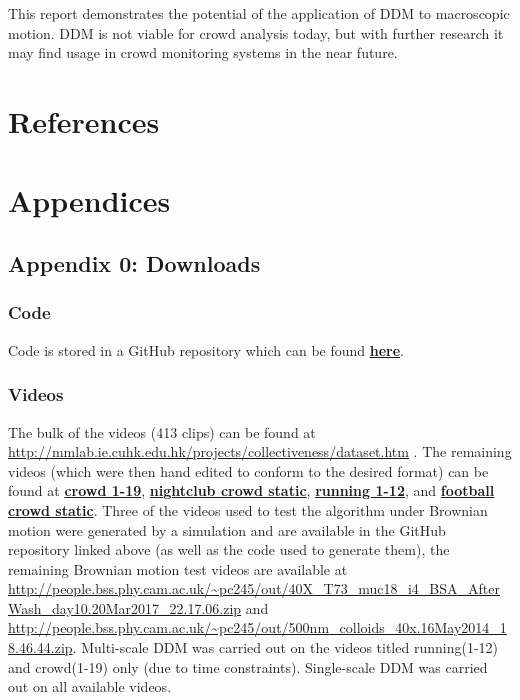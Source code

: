 \documentclass[10pt]{article}
\let\oldhref\href
\renewcommand{\href}[2]{\oldhref{#1}{\bfseries#2}}
\begin{document}
\\\\
This report demonstrates the potential of the application of DDM to macroscopic motion. DDM is not viable for crowd analysis today, but with further research it may find usage in crowd monitoring systems in the near future.

\clearpage
\section{References}
\printbibliography[heading=none]

\clearpage
\section{Appendices}
\subsection{Appendix 0: Downloads}
\subsubsection{Code}
Code is stored in a GitHub repository which can be found \href{https://github.com/jordanosborn/CrowdAnalysisDDM}{here}.
\subsubsection{Videos}
The bulk of the videos (413 clips) can be found at \url{http://mmlab.ie.cuhk.edu.hk/projects/collectiveness/dataset.htm} \cite{crowdMotionDB}. The remaining videos (which were then hand edited to conform to the desired format) can be found at \href{https://www.youtube.com/watch?v=nrST7C_mDT8}{crowd 1-19}, \href{https://www.youtube.com/watch?v=lpEF1uyCH44}{nightclub crowd static},  \href{https://www.youtube.com/watch?v=sj2er0LPlH0}{running 1-12}, and \href{https://www.youtube.com/watch?v=AQdZ2OTF7VA}{football crowd static}. Three of the videos used to test the algorithm under Brownian motion were generated by a simulation and are available in the GitHub repository linked above (as well as the code used to generate them), the remaining Brownian motion test videos are available at \url{http://people.bss.phy.cam.ac.uk/~pc245/out/40X_T73_muc18_i4_BSA_AfterWash_day10.20Mar2017_22.17.06.zip} and \url{http://people.bss.phy.cam.ac.uk/~pc245/out/500nm_colloids_40x.16May2014_18.46.44.zip}. Multi-scale DDM was carried out on the videos titled running(1-12) and crowd(1-19) only (due to time constraints). Single-scale DDM was carried out on all available videos.
\end{document}
